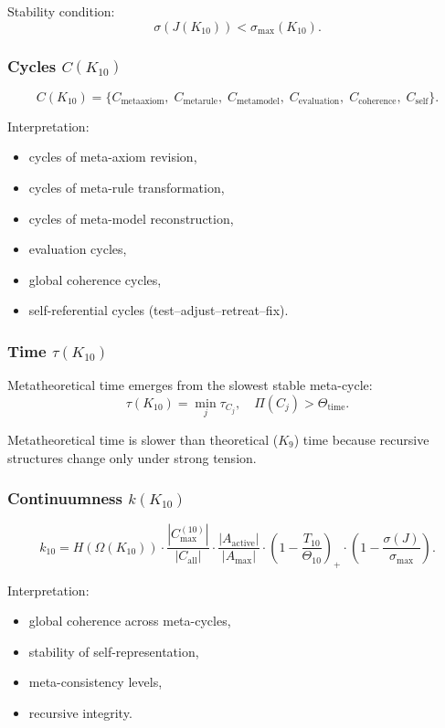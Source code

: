 Stability condition:
\[
\sigma(J(K_{10})) < \sigma_{\max}(K_{10}).
\]

\subsubsection{Cycles $C(K_{10})$}

\[
C(K_{10})=
\{
C_{\mathrm{metaaxiom}},\;
C_{\mathrm{metarule}},\;
C_{\mathrm{metamodel}},\;
C_{\mathrm{evaluation}},\;
C_{\mathrm{coherence}},\;
C_{\mathrm{self}}
\}.
\]

Interpretation:
\begin{itemize}
    \item cycles of meta-axiom revision,
    \item cycles of meta-rule transformation,
    \item cycles of meta-model reconstruction,
    \item evaluation cycles,
    \item global coherence cycles,
    \item self-referential cycles (test–adjust–retreat–fix).
\end{itemize}

\subsubsection{Time $\tau(K_{10})$}

Metatheoretical time emerges from the slowest stable meta-cycle:
\[
\tau(K_{10}) = \min_j \tau_{C_j},
\quad
\Pi(C_j) > \Theta_{\mathrm{time}}.
\]

Metatheoretical time is slower than theoretical ($K_9$) time because recursive structures change only under strong tension.

\subsubsection{Continuumness $k(K_{10})$}

\[
k_{10} =
H(\Omega(K_{10}))
\cdot
\frac{|C_{\max}^{(10)}|}{|C_{\mathrm{all}}|}
\cdot
\frac{|A_{\mathrm{active}}|}{|A_{\max}|}
\cdot
\left(1-\frac{T_{10}}{\Theta_{10}}\right)_+
\cdot
\left(1-\frac{\sigma(J)}{\sigma_{\max}}\right).
\]

Interpretation:
\begin{itemize}
    \item global coherence across meta-cycles,
    \item stability of self-representation,
    \item meta-consistency levels,
    \item recursive integrity.
\end{itemize}

